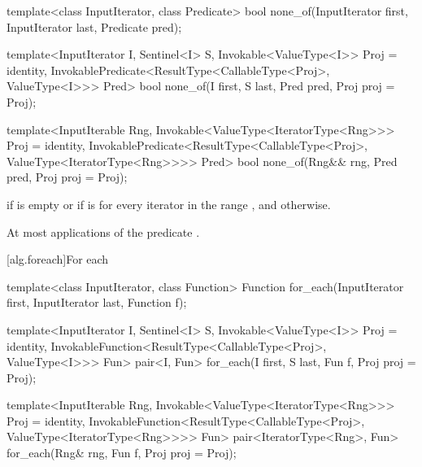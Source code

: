 %
\begin{removedblock}
\begin{itemdecl}
template<class InputIterator, class Predicate>
  bool none_of(InputIterator first, InputIterator last, Predicate pred);
\end{itemdecl}
\end{removedblock}
\begin{addedblock}
\begin{itemdecl}
template<InputIterator I, Sentinel<I> S,
    Invokable<ValueType<I>> Proj = identity,
    InvokablePredicate<ResultType<CallableType<Proj>, ValueType<I>>> Pred>
  bool none_of(I first, S last, Pred pred, Proj proj = Proj{});

template<InputIterable Rng,
    Invokable<ValueType<IteratorType<Rng>>> Proj = identity,
    InvokablePredicate<ResultType<CallableType<Proj>, ValueType<IteratorType<Rng>>>> Pred>
  bool none_of(Rng&& rng, Pred pred, Proj proj = Proj{});
\end{itemdecl}
\end{addedblock}

\begin{itemdescr}
\pnum
\returns {} if
 is empty or if
is  for every iterator  in the range ,
and  otherwise.

\pnum
\complexity At most  applications of the predicate
.
\end{itemdescr}

[alg.foreach]{For each}

%
\begin{removedblock}
\begin{itemdecl}
template<class InputIterator, class Function>
  Function for_each(InputIterator first, InputIterator last, Function f);
\end{itemdecl}
\end{removedblock}
\begin{addedblock}
\begin{itemdecl}
template<InputIterator I, Sentinel<I> S,
    Invokable<ValueType<I>> Proj = identity,
    InvokableFunction<ResultType<CallableType<Proj>, ValueType<I>>> Fun>
  pair<I, Fun>
    for_each(I first, S last, Fun f, Proj proj = Proj{});

template<InputIterable Rng,
    Invokable<ValueType<IteratorType<Rng>>> Proj = identity,
    InvokableFunction<ResultType<CallableType<Proj>, ValueType<IteratorType<Rng>>>> Fun>
  pair<IteratorType<Rng>, Fun>
    for_each(Rng& rng, Fun f, Proj proj = Proj{});
\end{itemdecl}
\end{addedblock}

